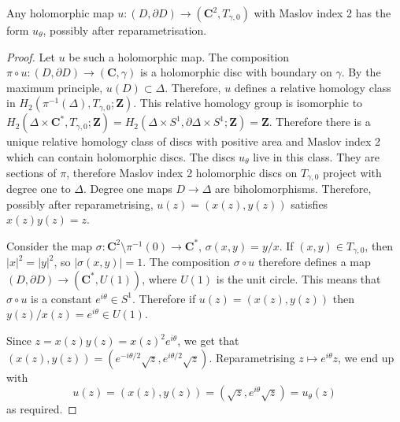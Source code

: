 \documentclass{amsart}
\begin{document}
\begin{Proposition}[prpchkdisc]
Any holomorphic map $u\colon\left(D,\partial D\right)\to\left(\mathbf{C}^2,T_{\gamma,0}\right)$ with Maslov index 2 has the form $u_{\theta}$, possibly after reparametrisation.
\end{Proposition}
\begin{proof}
Let $u$ be such a holomorphic map. The composition $\pi\circ u\colon (D,\partial D)\to(\mathbf{C},\gamma)$ is a holomorphic disc with boundary on $\gamma$. By the maximum principle, $u(D)\subset\Delta$. Therefore, $u$ defines a relative homology class in $H_2(\pi^{-1}(\Delta),T_{\gamma,0};\mathbf{Z})$. This relative homology group is isomorphic to $H_2(\Delta\times\mathbf{C}^*,T_{\gamma,0};\mathbf{Z})=H_2(\Delta\times S^1,\partial \Delta\times S^1;\mathbf{Z})=\mathbf{Z}$. Therefore there is a unique relative homology class of discs with positive area and Maslov index 2 which can contain holomorphic discs. The discs $u_{\theta}$ live in this class. They are sections of $\pi$, therefore Maslov index 2 holomorphic discs on $T_{\gamma,0}$ project with degree one to $\Delta$. Degree one maps $D\to\Delta$ are biholomorphisms. Therefore, possibly after reparametrising, $u(z)=(x(z),y(z))$ satisfies $x(z)y(z)=z$.

Consider the map $\sigma\colon\mathbf{C}^2\setminus\pi^{-1}(0)\to\mathbf{C}^*$, $\sigma(x,y)=y/x$. If $(x,y)\in T_{\gamma,0}$, then $|x|^2=|y|^2$, so $|\sigma(x,y)|=1$. The composition $\sigma\circ u$ therefore defines a map $(D,\partial D)\to (\mathbf{C}^*,U(1))$, where $U(1)$ is the unit circle. This means that $\sigma\circ u$ is a constant $e^{i\theta}\in S^1$. Therefore if $u(z)=(x(z),y(z))$ then $y(z)/x(z)=e^{i\theta}\in U(1)$.

Since $z=x(z)y(z)=x(z)^2e^{i\theta}$, we get that $(x(z),y(z))=(e^{-i\theta/2}\sqrt{z},e^{i\theta/2}\sqrt{z})$. Reparametrising $z\mapsto e^{i\theta}z$, we end up with
\[u(z)=(x(z),y(z))=(\sqrt{z},e^{i\theta}\sqrt{z})=u_\theta(z)\]
as required.
\end{proof}
\end{document}
